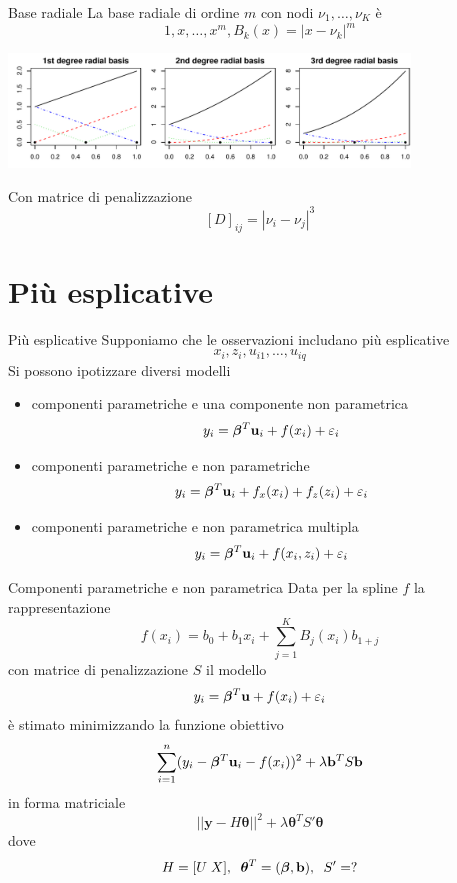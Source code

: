 \documentclass{beamer}\usepackage[]{graphicx}\usepackage[]{color}
\makeatletter
\newenvironment{kframe}{%
 \def\at@end@of@kframe{}%
 \ifinner\ifhmode%
  \def\at@end@of@kframe{\end{minipage}}%
  \begin{minipage}{\columnwidth}%
 \fi\fi%
 \def\FrameCommand##1{\hskip\@totalleftmargin \hskip-\fboxsep
 \colorbox{shadecolor}{##1}\hskip-\fboxsep
     \hskip-\linewidth \hskip-\@totalleftmargin \hskip\columnwidth}%
 \MakeFramed {\advance\hsize-\width
   \@totalleftmargin\z@ \linewidth\hsize
   \@setminipage}}%
 {\par\unskip\endMakeFramed%
 \at@end@of@kframe}
\newenvironment{knitrout}{}{} %
\makeatother
\begin{document}
\begin{frame}{Base radiale}
La base radiale di ordine $m$ con nodi $\nu_1,\ldots,\nu_K$ \`e
\[ 1, x, \ldots, x^m, B_k(x) = |x-\nu_k|^m \]
\begin{knitrout}
\color{fgcolor}\begin{kframe}


{\ttfamily\noindent\bfseries{}}\end{kframe}
\includegraphics[width=0.8\textwidth]{figure/020-regression-1radialbasis-1} 

\end{knitrout}

Con matrice di penalizzazione
\[ [D]_{ij} = |\nu_i-\nu_j|^3 \]

\end{frame}




\section[Multiplo]{Pi\`u esplicative}

\begin{frame}{Pi\`u esplicative}
Supponiamo che le osservazioni includano pi\`u esplicative
\[ x_{i},z_{i},u_{i1},\ldots,u_{iq}  \]
Si possono ipotizzare diversi modelli
\begin{itemize}
\item componenti parametriche e una componente non parametrica
\[ y_i = {\bm\beta}^T{\bf u}_i + f(x_i) + \varepsilon_i \]
\item componenti parametriche e non parametriche
\[ y_i = {\bm\beta}^T{\bf u}_i + f_x(x_i) + f_z(z_i) + \varepsilon_i \]
\item componenti parametriche e non parametrica multipla
\[ y_i = {\bm\beta}^T{\bf u}_i + f(x_i,z_i) + \varepsilon_i \]
\end{itemize}
\end{frame}

\begin{frame}{Componenti parametriche e non parametrica}
Data per la spline $f$ la rappresentazione
\[ f(x_i) = b_0 + b_1 x_i + \sum_{j=1}^K B_j(x_i)b_{1+j} \]
con matrice di penalizzazione $S$ il modello
\[ y_i = {\bm\beta}^T{\bf u} + f(x_i) + \varepsilon_i \]
\`e stimato minimizzando la funzione obiettivo
\[ \sum_{i=1}^n(y_i - {\bm\beta}^T{\bf u}_i - f(x_i))^2 + \lambda{\bf b}^TS{\bf b} \]
in forma matriciale
\[ ||{\bm y} - H{\bm\theta}||^2 + \lambda{\bm\theta}^TS'{\bm\theta} \]
dove
\[ H=[U\; X],\;\;{\bm\theta}^T=({\bm\beta},{\bf b}),\;\;S'=? \]
\end{frame}
\end{document}
